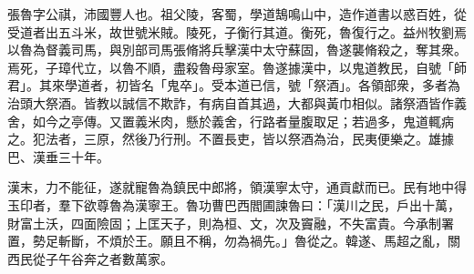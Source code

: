 \begin{pinyinscope}
 
 
 張魯字公祺，沛國豐人也。祖父陵，客蜀，學道鵠鳴山中，造作道書以惑百姓，從受道者出五斗米，故世號米賊。陵死，子衡行其道。衡死，魯復行之。益州牧劉焉以魯為督義司馬，與別部司馬張脩將兵擊漢中太守蘇固，魯遂襲脩殺之，奪其衆。焉死，子璋代立，以魯不順，盡殺魯母家室。魯遂據漢中，以鬼道教民，自號「師君」。其來學道者，初皆名「鬼卒」。受本道已信，號「祭酒」。各領部衆，多者為治頭大祭酒。皆教以誠信不欺詐，有病自首其過，大都與黃巾相似。諸祭酒皆作義舍，如今之亭傳。又置義米肉，懸於義舍，行路者量腹取足；若過多，鬼道輒病之。犯法者，三原，然後乃行刑。不置長吏，皆以祭酒為治，民夷便樂之。雄據巴、漢垂三十年。
 
 
 漢末，力不能征，遂就寵魯為鎮民中郎將，領漢寧太守，通貢獻而已。民有地中得玉印者，羣下欲尊魯為漢寧王。魯功曹巴西閻圃諫魯曰：「漢川之民，戶出十萬，財富土沃，四面險固；上匡天子，則為桓、文，次及竇融，不失富貴。今承制署置，勢足斬斷，不煩於王。願且不稱，勿為禍先。」魯從之。韓遂、馬超之亂，關西民從子午谷奔之者數萬家。
 

\end{pinyinscope}
